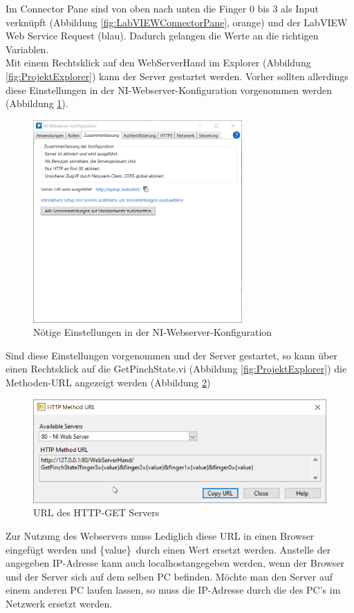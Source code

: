 \documentclass[a4paper,12pt,final]{article} %
\numberwithin{equation}{section} %
\numberwithin{figure}{section} %
\numberwithin{table}{section} %
\begin{document}
Im Connector Pane sind von oben nach unten die Finger 0 bis 3 als Input verknüpft (Abbildung \ref{fig:LabVIEWConnectorPane}, orange) und der LabVIEW Web Service Request (blau). 
Dadurch ge\-lang\-en die Werte an die richtigen Variablen.\\
Mit einem Rechtsklick auf den WebServerHand im Explorer (Abbildung \ref{fig:ProjektExplorer}) kann der Server gestartet werden. Vorher sollten allerdings diese Einstellungen in der NI-Web\-ser\-ver-Konfiguration vorgenommen werden (Abbildung \ref{fig:EinstellungenWebServer}).
\begin{figure}[H]
	\begin{center}
		\includegraphics[width=8cm]{Bilder/Einstellungen-StartServerNeu.png}
		\caption{Nötige Einstellungen in der NI-Webserver-Konfiguration}
		\label{fig:EinstellungenWebServer}
	\end{center}
\end{figure}
Sind diese Einstellungen vorgenommen und der Server gestartet, so kann über einen Rechtsklick auf die GetPinchState.vi (Abbildung \ref{fig:ProjektExplorer}) die Methoden-URL angezeigt wer\-den (Abbildung \ref{fig:HTTPMethod})
\begin{figure}[H]
	\begin{center}
		\includegraphics[width=12cm]{Bilder/HTTPMethod.png}
		\caption{URL des HTTP-GET Servers}
		\label{fig:HTTPMethod}
	\end{center}
\end{figure}
Zur Nutzung des Webservers muss Lediglich diese URL in einen Browser eingefügt werden und \glqq \{value\}\grqq\ durch einen Wert ersetzt werden.
Anstelle der angegeben IP-Adresse kann auch \glqq localhost\grqq angegeben werden, wenn der Browser und der Server sich auf dem selben PC befinden.
Möchte man den Server auf einem anderen PC laufen lassen, so muss die IP-Adresse durch die des PC's im Netzwerk ersetzt werden.
\end{document}
